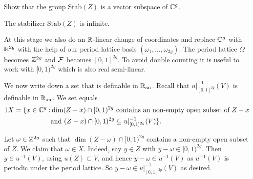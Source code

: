 \begin{exercise}
  Show that the group $\mathrm{Stab}(Z)$ is a vector subspace of
  ${\mathbb{C}}^g$. 
\end{exercise}

\begin{lemma}
  The stabilizer $\mathrm{Stab}(Z)$ is infinite. 
\end{lemma}

At this stage we also do an ${\mathbb{R}}$-linear change of coordinates and
replace ${\mathbb{C}}^g$ with ${\mathbb{R}}^{2g}$ with the help of our period lattice
basis $(\omega_1,\ldots,\omega_{2g})$.
The period lattice $\Omega$ becomes ${\mathbb{Z}}^{2g}$ and ${\mathcal F}$ becomes
$[0,1]^{2g}$. To avoid double counting it is useful to work with
$[0,1)^{2g}$ which is also real semi-linear. 

We now write down a set that is definable in ${{\mathbb{R}}_{\mathrm{an}}}$.
Recall that
 $u|_{[0,1]^{2g}}^{-1}(V)$ is definable in ${{\mathbb{R}}_{\mathrm{an}}}$.
We set equals
\begin{alignat*}1  
  X =  \{x \in\IC^g : &\dim (Z-x)\cap[0,1)^{2g}\text{ contains an
    non-empty open subset of $Z-x$}\\
  &\text{and } (Z-x)\cap [0,1)^{2g} \subset u|_{[0,1]^{2g}}^{-1}(V)\}. 
\end{alignat*}


Let $\omega \in{\mathbb{Z}}^{2g}$
such that $\dim (Z-\omega)\cap [0,1)^{2g}$ contains a non-empty open
subset of $Z$.
We claim that $\omega\in X$.
Indeed, say $y\in Z$ with $y-\omega\in [0,1)^{2g}$.
Then $y\in u^{-1}(V)$, using $u(Z)\subset V$, and hence
$y-\omega \in u^{-1}(V)$ as $u^{-1}(V)$ is periodic under the period
lattice. So $y-\omega \in u|_{[0,1]^{2g}}^{-1}(V)$ as desired.

